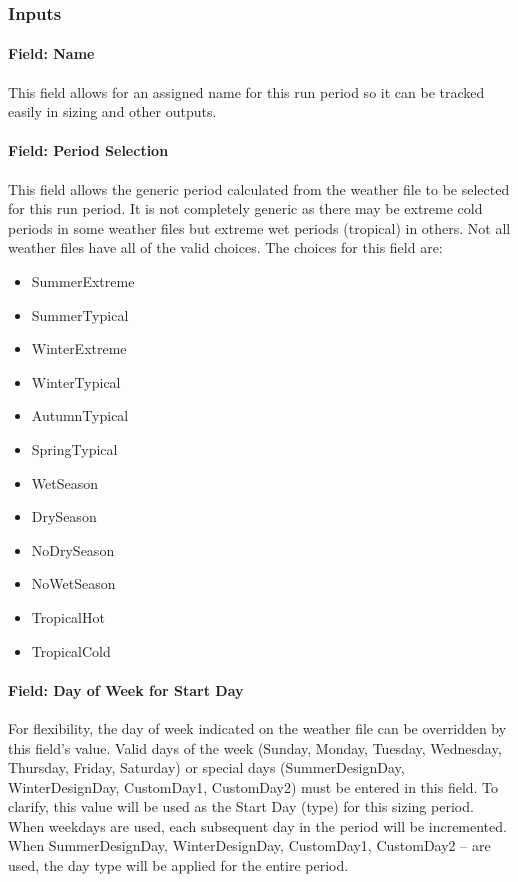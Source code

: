 \subsubsection{Inputs}\label{inputs-3-020}

\paragraph{Field: Name}\label{field-name-3-018}

This field allows for an assigned name for this run period so it can be tracked easily in sizing and other outputs.

\paragraph{Field: Period Selection}\label{field-period-selection}

This field allows the generic period calculated from the weather file to be selected for this run period. It is not completely generic as there may be extreme cold periods in some weather files but extreme wet periods (tropical) in others. Not all weather files have all of the valid choices. The choices for this field are:

\begin{itemize}
\item
  SummerExtreme
\item
  SummerTypical
\item
  WinterExtreme
\item
  WinterTypical
\item
  AutumnTypical
\item
  SpringTypical
\item
  WetSeason
\item
  DrySeason
\item
  NoDrySeason
\item
  NoWetSeason
\item
  TropicalHot
\item
  TropicalCold
\end{itemize}

\paragraph{Field: Day of Week for Start Day}\label{field-day-of-week-for-start-day-1}

For flexibility, the day of week indicated on the weather file can be overridden by this field's value. Valid days of the week (Sunday, Monday, Tuesday, Wednesday, Thursday, Friday, Saturday) or special days (SummerDesignDay, WinterDesignDay, CustomDay1, CustomDay2) must be entered in this field. To clarify, this value will be used as the Start Day (type) for this sizing period. When weekdays are used, each subsequent day in the period will be incremented. When SummerDesignDay, WinterDesignDay, CustomDay1, CustomDay2 -- are used, the day type will be applied for the entire period.

